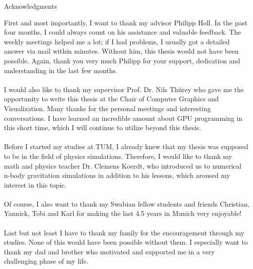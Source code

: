 \thispagestyle{empty}

\vspace*{20mm}

\begin{center}
{ Acknowledgments}
\end{center}

\vspace{10mm}


First and most importantly, I want to thank my advisor Philipp Holl. In the past four months, I could always count on his assistance and valuable feedback. The weekly meetings helped me a lot; if I had problems, I usually got a detailed answer via mail within minutes. Without him, this thesis would not have been possible. Again, thank you very much Philipp for your support, dedication and understanding in the last few months. \\\\
I would also like to thank my supervisor Prof. Dr. Nils Thürey who gave me the opportunity to write this thesis at the Chair of Computer Graphics and Visualization. Many thanks for the personal meetings and interesting conversations. I have learned an incredible amount about GPU programming in this short time, which I will continue to utilize beyond this thesis.\\\\
Before I started my studies at TUM, I already knew that my thesis was supposed to be in the field of physics simulations. Therefore, I would like to thank my math and physics teacher Dr. Clemens Koerdt, who introduced us to numerical n-body gravitation simulations in addition to his lessons, which aroused my interest in this topic.\\\\
Of course, I also want to thank my Swabian fellow students and friends Christian, Yannick, Tobi and Karl for making the last 4.5 years in Munich very enjoyable!\\\\
Last but not least I have to thank my family for the encouragement through my studies. None of this would have been possible without them. I especially want to thank my dad and brother who motivated and supported me in a very challenging phase of my life.
\cleardoublepage{}
